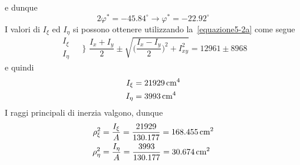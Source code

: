 e dunque 
\begin{equation*}
2\varphi^{*} = -45.84^{\circ} \longrightarrow \boxed{\varphi^{*}=-22.92^{\circ}}
\end{equation*}
I valori di $I_{\xi}$ ed $I_{\eta}$ si possono ottenere utilizzando la~\eqref{equazione5-2a} come segue
\begin{equation*}
\begin{aligned}
I_{\xi} & \\
I_{\eta} &
\end{aligned}
\,\,\Biggr\}\,\, \frac{I_{x}+I_{y}}{2} \pm \sqrt{\biggl(\frac{I_{x}-I_{y}}{2}\biggr)^{2}+I_{xy}^{2}}=12961\pm8968
\end{equation*}
e quindi
\begin{align*}
I_{\xi} &= 21929\,\textup{cm}^{4} \\
I_{\eta} &= 3993\,\textup{cm}^{4}
\end{align*}
I raggi principali di inerzia valgono, dunque
\begin{align*}
\rho_{\xi}^{2} &= \frac{I_{\xi}}{A} = \frac{21929}{130.177} = 168.455\,\textup{cm}^{2} \\
\rho_{\eta}^{2} &= \frac{I_{\eta}}{A} = \frac{3993}{130.177} = 30.674\,\textup{cm}^{2}
\end{align*}

